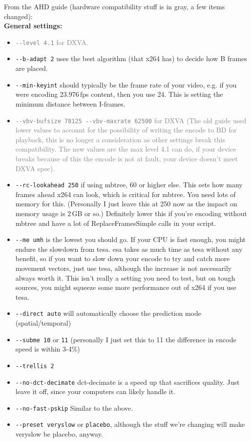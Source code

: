 \documentclass{scrartcl}
\begin{document}
From the AHD guide (hardware compatibility stuff is in gray, a few items changed):\\
\textbf{General settings:}
\begin{itemize}
\item \textcolor{gray}{\texttt{-{}-level 4.1} for DXVA.}
\item \texttt{-{}-b-adapt 2} uses the best algorithm (that x264 has) to decide how B frames are placed.
\item \texttt{-{}-min-keyint} should typically be the frame rate of your video, e.g. if you were encoding 23.976\,fps content, then you use 24. This is setting the minimum distance between I-frames.
\item \textcolor{gray}{\texttt{-{}-vbv-bufsize 78125 -{}-vbv-maxrate 62500} for DXVA (The old guide used lower values to account for the possibility of writing the encode to BD for playback, this is no longer a consideration as other settings break this compatibility. The new values are the max level 4.1 can do, if your device breaks because of this the encode is not at fault, your device doesn't meet DXVA spec).}
\item \texttt{-{}-rc-lookahead 250} if using mbtree, 60 or higher else. This sets how many frames ahead x264 can look, which is critical for mbtree. You need lots of memory for this. (Personally I just leave this at 250 now as the impact on memory usage is 2\,GB or so.)  Definitely lower this if you're encoding without mbtree and have a lot of ReplaceFramesSimple calls in your script.
\item \texttt{-{}-me umh} is the lowest you should go.  If your CPU is fast enough, you might endure the slowdown from tesa. esa takes as much time as tesa without any benefit, so if you want to slow down your encode to try and catch more movement vectors, just use tesa, although the increase is not necessarily always worth it. This isn't really a setting you need to test, but on tough sources, you might squeeze some more performance out of x264 if you use tesa.
\item \texttt{-{}-direct auto} will automatically choose the prediction mode (spatial/temporal)
\item \texttt{-{}-subme 10} or \texttt{11} (personally I just set this to 11 the difference in encode speed is within 3-4\%)
\item \texttt{-{}-trellis 2}
\item \texttt{-{}-no-dct-decimate} dct-decimate is a speed up that sacrifices quality.  Just leave it off, since your computers can likely handle it.
\item \texttt{-{}-no-fast-pskip} Similar to the above.
\item \texttt{-{}-preset veryslow} or \texttt{placebo}, although the stuff we're changing will make veryslow be placebo, anyway.
\end{itemize}
\end{document}

